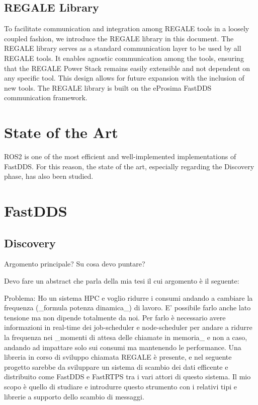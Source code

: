 \subsection{REGALE Library}
To facilitate communication and integration among REGALE tools in a loosely coupled fashion, we introduce the REGALE library in this document. The REGALE library serves as a standard communication layer to be used by all REGALE tools. It enables agnostic communication among the tools, ensuring that the REGALE Power Stack remains easily extensible and not dependent on any specific tool. This design allows for future expansion with the inclusion of new tools. The REGALE library is built on the eProsima FastDDS communication framework.
\newpage
\section{State of the Art}
ROS2 is one of the most efficient and well-implemented implementations of FastDDS. For this reason, the state of the art, especially regarding the Discovery phase, has also been studied.

\section{FastDDS}

\subsection{Discovery}



Argomento principale? Su cosa devo puntare?

Devo fare un abstract che parla della mia tesi il cui argomento è il seguente:

Problema: Ho un sistema HPC e voglio ridurre i consumi andando a cambiare la frequenza (_formula potenza dinamica_) di lavoro. E' possibile farlo anche lato tensione ma non dipende totalmente da noi. Per farlo è necessario avere informazioni in real-time dei job-scheduler e node-scheduler per andare a ridurre la frequenza nei _momenti di attesa delle chiamate in memoria_ e non a caso, andando ad impattare solo sui consumi ma mantenendo le performance. Una libreria in corso di sviluppo chiamata REGALE è presente, e nel seguente progetto sarebbe da sviluppare un sistema di scambio dei dati efficente e distribuito come FastDDS e FastRTPS tra i vari attori di questo sistema. Il mio scopo è quello di studiare e introdurre questo strumento con i relativi tipi e librerie a supporto dello scambio di messaggi.

